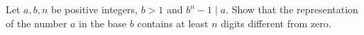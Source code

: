 Let $a, b, n$ be positive integers, $b > 1$ and $b^n - 1 \mid a$. Show that the representation of the number $a$ in the base $b$ contains at least $n$ digits different from zero.
